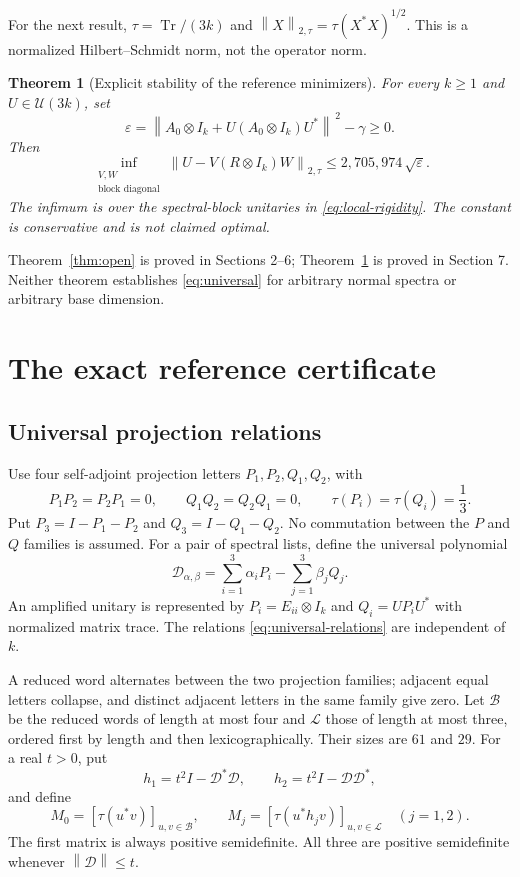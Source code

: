 \documentclass[11pt]{article}
\newtheorem{theorem}{Theorem}[section]
\theoremstyle{remark}\newtheorem{remark}[theorem]{Remark}
\newcommand{\U}{\mathcal U}
\newcommand{\Tr}{\operatorname{Tr}}
\newcommand{\norm}[1]{\left\lVert#1\right\rVert}
\newcommand{\hs}[1]{\left\lVert#1\right\rVert_{2,\tau}}
\newcommand{\Bwords}{\mathcal B}
\newcommand{\Lwords}{\mathcal L}
\begin{document}
For the next result, $\tau=\Tr/(3k)$ and $\hs{X}=\tau(X^*X)^{1/2}$. This is a normalized Hilbert--Schmidt norm, not the operator norm.

\begin{theorem}[Explicit stability of the reference minimizers]\label{thm:stability}
For every $k\ge1$ and $U\in\U(3k)$, set
\[
 \varepsilon=\norm{A_0\otimes I_k+U(A_0\otimes I_k)U^*}^{\,2}-\gamma\ge0.
\]
Then
\begin{equation}\label{eq:stability}
 \inf_{\substack{V,W\\\text{block diagonal}}}
 \hs{U-V(R\otimes I_k)W}
 \le 2{,}705{,}974\,\sqrt{\varepsilon}.
\end{equation}
The infimum is over the spectral-block unitaries in \eqref{eq:local-rigidity}. The constant is conservative and is not claimed optimal.
\end{theorem}
Theorem~\ref{thm:open} is proved in Sections 2--6; Theorem~\ref{thm:stability} is proved in Section 7. Neither theorem establishes \eqref{eq:universal} for arbitrary normal spectra or arbitrary base dimension.

\section{The exact reference certificate}
\subsection{Universal projection relations}
Use four self-adjoint projection letters $P_1,P_2,Q_1,Q_2$, with
\begin{equation}\label{eq:universal-relations}
 P_1P_2=P_2P_1=0,\qquad Q_1Q_2=Q_2Q_1=0,
 \qquad \tau(P_i)=\tau(Q_i)=\frac13.
\end{equation}
Put $P_3=I-P_1-P_2$ and $Q_3=I-Q_1-Q_2$. No commutation between the $P$ and $Q$ families is assumed. For a pair of spectral lists, define the universal polynomial
\begin{equation}\label{eq:universal-D}
 \mathcal D_{\alpha,\beta}=\sum_{i=1}^3\alpha_iP_i-\sum_{j=1}^3\beta_jQ_j.
\end{equation}
An amplified unitary is represented by $P_i=E_{ii}\otimes I_k$ and $Q_i=UP_iU^*$ with normalized matrix trace. The relations \eqref{eq:universal-relations} are independent of $k$.

A reduced word alternates between the two projection families; adjacent equal letters collapse, and distinct adjacent letters in the same family give zero. Let $\Bwords$ be the reduced words of length at most four and $\Lwords$ those of length at most three, ordered first by length and then lexicographically. Their sizes are $61$ and $29$. For a real $t>0$, put
\[
 h_1=t^2I-\mathcal D^*\mathcal D,\qquad h_2=t^2I-\mathcal D\mathcal D^*,
\]
and define
\[
 M_0=[\tau(u^*v)]_{u,v\in\Bwords},\qquad
 M_j=[\tau(u^*h_jv)]_{u,v\in\Lwords}\quad(j=1,2).
\]
The first matrix is always positive semidefinite. All three are positive semidefinite whenever $\norm{\mathcal D}\le t$.
\end{document}
